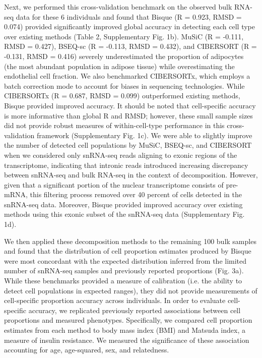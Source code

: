 Next, we performed this cross-validation benchmark on the observed bulk RNA-seq data for these 6 individuals and found that Bisque (R = 0.923, RMSD = 0.074) provided significantly improved global accuracy in detecting each cell type over existing methods (Table 2, Supplementary Fig. 1b). MuSiC (R = -0.111, RMSD = 0.427), BSEQ-sc (R = -0.113, RMSD = 0.432), and CIBERSORT (R = -0.131, RMSD = 0.416) severely underestimated the proportion of adipocytes (the most abundant population in adipose tissue) while overestimating the endothelial cell fraction. We also benchmarked CIBERSORTx\cite{Newman2019-mq}, which employs a batch correction mode to account for biases in sequencing technologies. While CIBERSORTx (R = 0.687, RMSD = 0.099) outperformed existing methods, Bisque provided improved accuracy. It should be noted that cell-specific accuracy is more informative than global R and RMSD; however, these small sample sizes did not provide robust measures of within-cell-type performance in this cross-validation framework (Supplementary Fig. 1c). We were able to slightly improve the number of detected cell populations by MuSiC, BSEQ-sc, and CIBERSORT when we considered only snRNA-seq reads aligning to exonic regions of the transcriptome, indicating that intronic reads introduced increasing discrepancy between snRNA-seq and bulk RNA-seq in the context of decomposition. However, given that a significant portion of the nuclear transcriptome consists of pre-mRNA, this filtering process removed over 40 percent of cells detected in the snRNA-seq data. Moreover, Bisque provided improved accuracy over existing methods using this exonic subset of the snRNA-seq data (Supplementary Fig. 1d). 

We then applied these decomposition methods to the remaining 100 bulk samples and found that the distribution of cell proportion estimates produced by Bisque were most concordant with the expected distribution inferred from the limited number of snRNA-seq samples and previously reported proportions\cite{Rosen2014-ae,Glastonbury_undated-kk} (Fig. 3a). While these benchmarks provided a measure of calibration (i.e. the ability to detect cell populations in expected ranges), they did not provide measurements of cell-specific proportion accuracy across individuals. In order to evaluate cell-specific accuracy, we replicated previously reported associations between cell proportions and measured phenotypes. Specifically, we compared cell proportion estimates from each method to body mass index (BMI) and Matsuda index, a measure of insulin resistance. We measured the significance of these association accounting for age, age-squared, sex, and relatedness.

